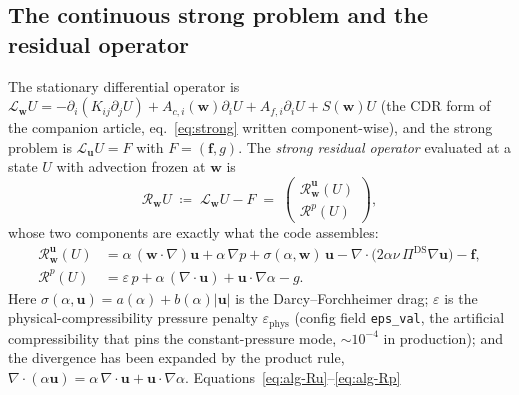 \documentclass{article}
\newcommand{\code}[1]{\texttt{\small #1}}
\begin{document}
\subsection{The continuous strong problem and the residual operator}
\label{sec:alg-continuous}

The stationary differential operator is
$\mathcal{L}_{\boldsymbol{w}} U
  = -\partial_i (K_{ij}\partial_j U)
  + A_{c,i}(\boldsymbol{w})\partial_i U
  + A_{f,i}\partial_i U
  + S(\boldsymbol{w}) U$ (the CDR form of the companion article,
eq.~\eqref{eq:strong} written component-wise), and the strong problem is
$\mathcal{L}_{\boldsymbol{u}} U = F$ with $F = (\boldsymbol{f}, g)$. The
\emph{strong residual operator} evaluated at a state $U$ with advection
frozen at $\boldsymbol{w}$ is
\begin{equation}
    \label{eq:alg-strong-residual}
    \mathcal{R}_{\boldsymbol{w}} U
        \;\coloneqq\; \mathcal{L}_{\boldsymbol{w}} U - F
        \;=\;
        \begin{pmatrix}
            \mathcal{R}^{\boldsymbol{u}}_{\boldsymbol{w}}(U) \\[1mm]
            \mathcal{R}^{p}(U)
        \end{pmatrix},
\end{equation}
whose two components are exactly what the code assembles:
\begin{align}
    \label{eq:alg-Ru}
    \mathcal{R}^{\boldsymbol{u}}_{\boldsymbol{w}}(U)
        &= \alpha\,(\boldsymbol{w}\!\cdot\!\nabla)\boldsymbol{u}
         + \alpha\,\nabla p
         + \sigma(\alpha,\boldsymbol{w})\,\boldsymbol{u}
         - \nabla\!\cdot\!\bigl(2\alpha\nu\,\Pi^{\mathrm{DS}}\nabla\boldsymbol{u}\bigr)
         - \boldsymbol{f}, \\
    \label{eq:alg-Rp}
    \mathcal{R}^{p}(U)
        &= \varepsilon\,p
         + \alpha\,(\nabla\!\cdot\!\boldsymbol{u})
         + \boldsymbol{u}\!\cdot\!\nabla\alpha
         - g .
\end{align}
Here $\sigma(\alpha,\boldsymbol{u}) = a(\alpha) + b(\alpha)|\boldsymbol{u}|$
is the Darcy--Forchheimer drag; $\varepsilon$ is the
physical-compressibility pressure penalty $\varepsilon_{\mathrm{phys}}$
(config field \code{eps\_val}, the artificial compressibility that pins
the constant-pressure mode, $\sim 10^{-4}$ in production); and
the divergence has been expanded by the product rule,
$\nabla\!\cdot\!(\alpha\boldsymbol{u}) = \alpha\,\nabla\!\cdot\!\boldsymbol{u}
+ \boldsymbol{u}\!\cdot\!\nabla\alpha$. Equations~\eqref{eq:alg-Ru}--\eqref{eq:alg-Rp}
\end{document}
